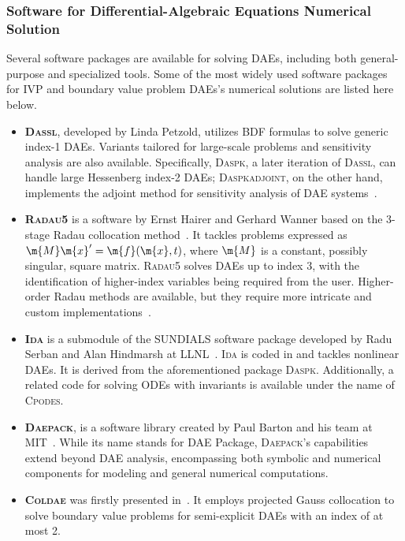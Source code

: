 \subsubsection[Software for DAEs Numerical Solution]{Software for Differential-Algebraic Equations Numerical Solution}

Several software packages are available for solving \acp{DAE}, including both general-purpose and specialized tools. Some of the most widely used software packages for \ac{IVP} and boundary value problem \acp{DAE}'s numerical solutions are listed here below.
%
\begin{itemize}
  \setlength{\itemsep}{0.0em}
  \item \textbf{\textsc{Dassl}}, developed by Linda Petzold, utilizes \ac{BDF} formulas to solve generic index-1 \acp{DAE}. Variants tailored for large-scale problems and sensitivity analysis are also available. Specifically, \textsc{Daspk}, a later iteration of \textsc{Dassl}, can handle large Hessenberg index-2 \acp{DAE}; \textsc{Daspkadjoint}, on the other hand, implements the adjoint method for sensitivity analysis of \ac{DAE} systems~\cite{brenan1995numerical}.
  \item \textbf{\textsc{Radau5}} is a software by Ernst Hairer and Gerhard Wanner based on the 3-stage Radau collocation method~\cite{hairer1999stiff}. It tackles problems expressed as $\m{M}\m{x}^{\prime} = \m{f}(\m{x}, t)$, where $\m{M}$ is a constant, possibly singular, square matrix. \textsc{Radau5} solves \acp{DAE} up to index 3, with the identification of higher-index variables being required from the user. Higher-order Radau methods are available, but they require more intricate and custom implementations~\cite{martinvaquero2010radau}.
  \item \textbf{\textsc{Ida}} is a submodule of the \ac{SUNDIALS} software package developed by Radu Serban and Alan Hindmarsh at \ac{LLNL}~\cite{hindmarsh2005sundials, gardner2022sundials}. \textsc{Ida} is coded in \cc{} and tackles nonlinear \acp{DAE}. It is derived from the aforementioned \Fortran{} package \textsc{Daspk}. Additionally, a related code for solving \acp{ODE} with invariants is available under the name of \textsc{Cpodes}.
  \item \textbf{\textsc{Daepack}}, is a software library created by Paul Barton and his team at \ac{MIT}~\cite{tolsma2000daepack}. While its name stands for \ac{DAE} Package, \textsc{Daepack}'s capabilities extend beyond \ac{DAE} analysis, encompassing both symbolic and numerical components for modeling and general numerical computations.
  \item \textbf{\textsc{Coldae}} was firstly presented in~\cite{bader1987new}. It employs projected Gauss collocation to solve boundary value problems for semi-explicit \acp{DAE} with an index of at most 2.
\end{itemize}

